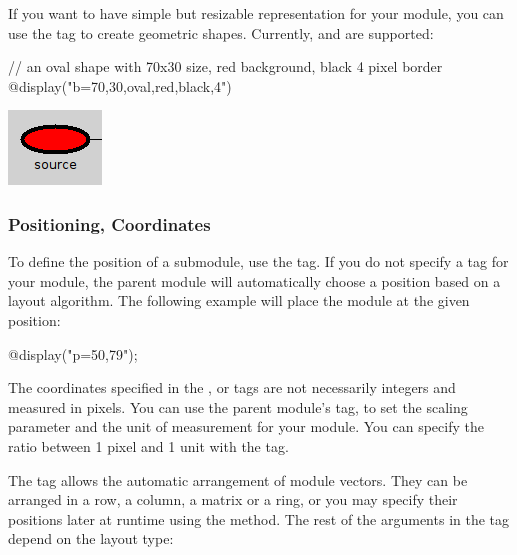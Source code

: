 If you want to have simple but resizable representation for your module, you can use
the  tag to create geometric shapes. Currently,  and 
are supported:

\begin{ned}
// an oval shape with 70x30 size, red background, black 4 pixel border
@display("b=70,30,oval,red,black,4")
\end{ned}

\begin{center}
\includegraphics{figures/graphics-btag}
\end{center}

\subsubsection{Positioning, Coordinates}

To define the position of a submodule, use the  tag.
If you do not specify a  tag for your module, the parent module will
automatically choose a position based on a layout algorithm.
The following example will place the module at the given position:

\begin{ned}
@display("p=50,79");
\end{ned}

\begin{note}
The coordinates specified in the ,  or  tags are not necessarily
integers and measured in pixels. You can use the parent module's  tag,
to set the scaling parameter and the unit of measurement for your module.
You can specify the ratio between 1 pixel and 1 unit with the  tag.
\end{note}

The  tag allows the automatic arrangement of module vectors. They can be
arranged in a row, a column, a matrix or a ring, or you may specify their positions
later at runtime using the  method. The rest of the arguments
in the  tag depend on the layout type:

